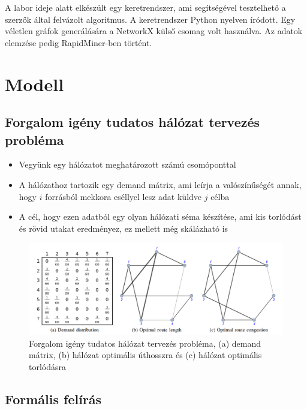 \documentclass[12pt]{report}
\begin{document}
A labor ideje alatt elkészült egy keretrendszer, ami segítségével tesztelhető a szerzők által felvázolt algoritmus. 
A keretrendszer Python \cite{noauthor_python_nodate} nyelven íródott.
Egy véletlen gráfok generálására a NetworkX külső csomag volt használva\cite{noauthor_networkx_nodate}.
Az adatok elemzése pedig RapidMiner-ben történt\cite{noauthor_lightning_nodate}.

\chapter{Modell}

\section{Forgalom igény tudatos hálózat tervezés probléma}

\begin{itemize}
	\item Vegyünk egy hálózatot meghatározott számú csomóponttal
	\item A hálózathoz tartozik egy demand mátrix, ami leírja a valószínűségét annak, hogy $i$ forrásból mekkora eséllyel lesz adat küldve $j$ célba
	\item A cél, hogy ezen adatból egy olyan hálózati séma készítése, ami kis torlódást és rövid utakat eredményez, ez mellett még skálázható is
\end{itemize}

\begin{figure}[h]
	\centering
	\includegraphics[width=14cm]{pictures/example.png}
	\caption{Forgalom igény tudatos hálózat tervezés probléma, (a) demand mátrix, (b) hálózat optimális úthosszra és (c) hálózat optimális torlódásra}
	\label{network_types}
\end{figure}

\section{Formális felírás}
\end{document}
